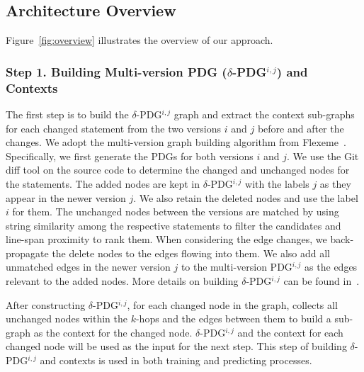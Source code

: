 \subsection{Architecture Overview}


Figure~\ref{fig:overview} illustrates the overview of our approach.

\subsubsection{{\bf Step 1. Building Multi-version PDG ($\delta$-PDG$^{i,j}$) and Contexts}}
The first step is to build the $\delta$-PDG$^{i,j}$ graph and extract
the context sub-graphs for each changed statement from the two
versions $i$ and $j$ before and after the changes. We adopt the
multi-version graph building algorithm from
Flexeme~\cite{flexeme-fse20}. Specifically, we first generate the PDGs
for both versions $i$ and $j$. We use the Git diff tool on the source
code to determine the changed and unchanged nodes for the
statements. The added nodes are kept in $\delta$-PDG$^{i,j}$ with the
labels $j$ as they appear in the newer version $j$. We also retain the
deleted nodes and use the label $i$ for them. The unchanged nodes
between the versions are matched by using string similarity among the
respective statements to filter the candidates and line-span proximity
to rank them. When considering the edge changes, we back-propagate the
delete nodes to the edges flowing into them. We also add all unmatched
edges in the newer version $j$ to the multi-version PDG$^{i,j}$ as the
edges relevant to the added nodes. More details on building
$\delta$-PDG$^{i,j}$ can be found in~\cite{flexeme-fse20}.

After constructing $\delta$-PDG$^{i,j}$, for each changed node in the
graph, \tool collects all unchanged nodes within the $k$-hops and the
edges between them to build a sub-graph as the context for the changed
node. $\delta$-PDG$^{i,j}$ and the context for each changed node will
be used as the input for the next step. This step of building
$\delta$-PDG$^{i,j}$ and contexts is used in both training and
predicting processes.

